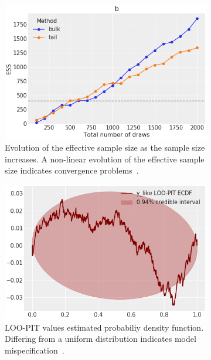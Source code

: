 \documentclass[anonymous=false, %
               format=acmsmall, %
               review=true, %
               screen=true, %
               nonacm=true]{acmart}
\begin{document}
\begin{figure}[!htb]
\centering
  \begin{subfigure}{.47\textwidth}
  \centering
    \includegraphics[width=\linewidth]{plot_ess.png}
    \caption{Evolution of the effective sample size as the sample size
    increases. A non-linear evolution of the effective sample size
    indicates convergence problems~\cite{vehtari2019rank}.}
  \end{subfigure}
  \begin{subfigure}{.47\textwidth}
  \centering
    \includegraphics[width=\linewidth]{plot_loo_pit.png}
    \caption{LOO-PIT values estimated probabiliy density function. Differing
      from a uniform distribution indicates model
      mispecification~\cite{gabry2019visualization}.}
  \end{subfigure}\\
  \begin{subfigure}{0.98\textwidth}

\end{subfigure}
\end{figure}
\end{document}

